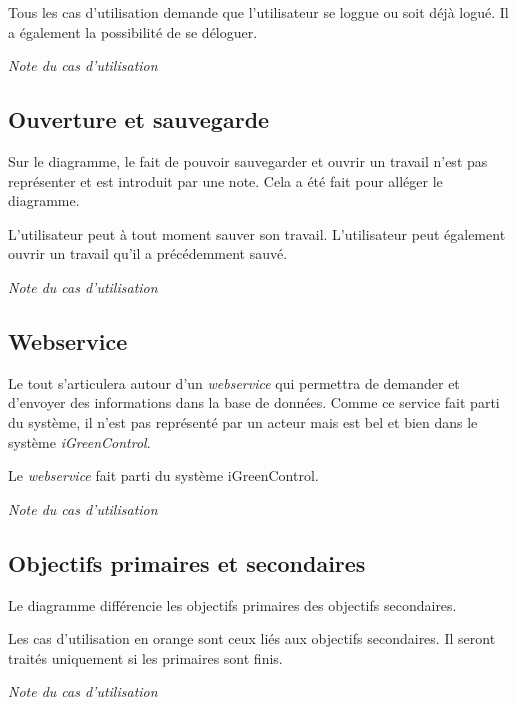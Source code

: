 \begin{shadequote}
Tous les cas d'utilisation demande que l'utilisateur se loggue ou soit déjà logué. Il a également la possibilité de se déloguer. \par\emph{Note du cas d'utilisation}
\end{shadequote}

\subsection{Ouverture et sauvegarde}
Sur le diagramme, le fait de pouvoir sauvegarder et ouvrir un travail n'est pas représenter et est introduit par une note. Cela a été fait pour alléger le diagramme.

\begin{shadequote}
L'utilisateur peut à tout moment sauver son travail.
L'utilisateur peut également ouvrir un travail qu'il a précédemment sauvé. \par\emph{Note du cas d'utilisation}
\end{shadequote}


\subsection{Webservice}

Le tout s'articulera autour d'un \emph{\gls{webservice}} qui permettra de demander et d'envoyer des informations dans la base de données. Comme ce service fait parti du système, il  n'est pas représenté par un acteur mais est bel et bien dans le système \emph{iGreenControl}.

\begin{shadequote}
Le \emph{\gls{webservice}} fait parti du système iGreenControl. \par\emph{Note du cas d'utilisation}
\end{shadequote}


\subsection{Objectifs primaires et secondaires}
Le diagramme différencie les objectifs primaires des objectifs secondaires.

\begin{shadequote}
Les cas d'utilisation en orange sont ceux liés aux objectifs secondaires.
Il seront traités uniquement si les primaires sont finis. \par\emph{Note du cas d'utilisation}
\end{shadequote}

